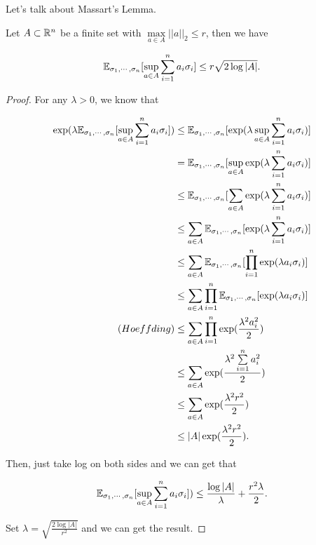 \documentclass[../main.tex]{subfiles}
\begin{document}
	Let's talk about Massart's Lemma.
	
	\begin{theorem}
		Let $A \subset \mathbb{R}^n$ be a finite set with $\max\limits_{a\in A} ||a||_2 \leq r$, then we have
		
		\begin{equation}
			\mathbb{E}_{\sigma_1, \cdots, \sigma_n} [\sup\limits_{a\in A} \sum\limits_{i=1}^n a_i \sigma_i] \leq r \sqrt{2\log |A|}.
		\end{equation}
	\end{theorem}

	\begin{proof}
		For any $\lambda > 0$, we know that 
		
		\begin{equation*}
			\begin{aligned}
				\exp(\lambda \mathbb{E}_{\sigma_1, \cdots, \sigma_n} [\sup\limits_{a\in A} \sum\limits_{i=1}^n a_i \sigma_i]) &  \leq \mathbb{E}_{\sigma_1, \cdots, \sigma_n} [\exp(\lambda  \sup\limits_{a\in A} \sum\limits_{i=1}^n a_i \sigma_i)] \\
				& = \mathbb{E}_{\sigma_1, \cdots, \sigma_n} [\sup\limits_{a\in A} \exp(\lambda   \sum\limits_{i=1}^n a_i \sigma_i)] \\
				& \leq \mathbb{E}_{\sigma_1, \cdots, \sigma_n} [\sum\limits_{a\in A} \exp(\lambda   \sum\limits_{i=1}^n a_i \sigma_i)] \\
				& \leq \sum\limits_{a\in A} \mathbb{E}_{\sigma_1, \cdots, \sigma_n} [ \exp(\lambda   \sum\limits_{i=1}^n a_i \sigma_i)] \\
				& \leq \sum\limits_{a\in A} \mathbb{E}_{\sigma_1, \cdots, \sigma_n} [ \prod_{i=1}^n \exp(\lambda  a_i \sigma_i)] \\
				& \leq \sum\limits_{a\in A}  \prod_{i=1}^n  \mathbb{E}_{\sigma_1, \cdots, \sigma_n} [\exp(\lambda  a_i \sigma_i)] \\
			(Hoeffding)	& \leq \sum\limits_{a\in A}  \prod_{i=1}^n  \exp(\frac{\lambda^2 a_i^2}{2})\\
				& \leq \sum\limits_{a\in A}   \exp(\frac{\lambda^2  \sum\limits_{i=1}^n a_i^2}{2}) \\
				& \leq \sum\limits_{a\in A}   \exp(\frac{\lambda^2  r^2}{2}) \\
				& \leq |A| \exp(\frac{\lambda^2  r^2}{2}).
			\end{aligned}
		\end{equation*}
		
		Then, just take log on both sides and we can get that 
		
		\begin{equation*}
			\mathbb{E}_{\sigma_1, \cdots, \sigma_n} [\sup\limits_{a\in A} \sum\limits_{i=1}^n a_i \sigma_i])  \leq \frac{\log |A|}{\lambda} + \frac{r^2 \lambda}{2}.
		\end{equation*}
		
		Set $\lambda = \sqrt{\frac{2\log |A|}{r^2}}$ and we can get the result.
	\end{proof}
	
\end{document}
